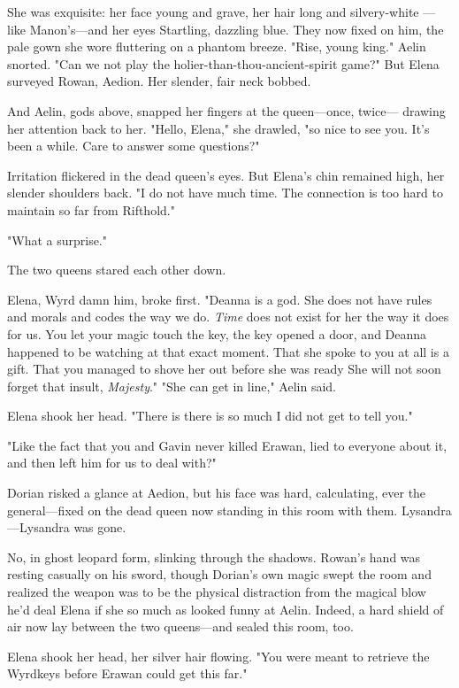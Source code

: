 She was exquisite: her face young and grave, her hair long and silvery-white ---like Manon's---and her eyes  Startling, dazzling blue. They now fixed on him, the pale gown she wore fluttering on a phantom breeze. "Rise, young king." Aelin snorted. "Can we not play the holier-than-thou-ancient-spirit game?" But Elena surveyed Rowan, Aedion. Her slender, fair neck bobbed.

And Aelin, gods above, snapped her fingers at the queen---once, twice--- drawing her attention back to her. "Hello, Elena," she drawled, "so nice to see you. It's been a while. Care to answer some questions?"

Irritation flickered in the dead queen's eyes. But Elena's chin remained high, her slender shoulders back. "I do not have much time. The connection is too hard to maintain so far from Rifthold."

"What a surprise."

The two queens stared each other down.

Elena, Wyrd damn him, broke first. "Deanna is a god. She does not have rules and morals and codes the way we do. \emph{Time} does not exist for her the way it does for us. You let your magic touch the key, the key opened a door, and Deanna happened to be watching at that exact moment. That she spoke to you at all is a gift. That you managed to shove her out before she was ready  She will not soon forget that insult,
\emph{Majesty}." "She can get in line," Aelin said.

Elena shook her head. "There is  there is so much I did not get to tell you."

"Like the fact that you and Gavin never killed Erawan, lied to everyone about it, and then left him for us to deal with?"

Dorian risked a glance at Aedion, but his face was hard, calculating, ever the general---fixed on the dead queen now standing in this room with them. Lysandra---Lysandra was gone.

No, in ghost leopard form, slinking through the shadows. Rowan's hand was resting casually on his sword, though Dorian's own magic swept the room and realized the weapon was to be the physical distraction from the magical blow he'd deal Elena if she so much as looked funny at Aelin. Indeed, a hard shield of air now lay between the two queens---and sealed this room, too.

Elena shook her head, her silver hair flowing. "You were meant to retrieve the Wyrdkeys before Erawan could get this far."

